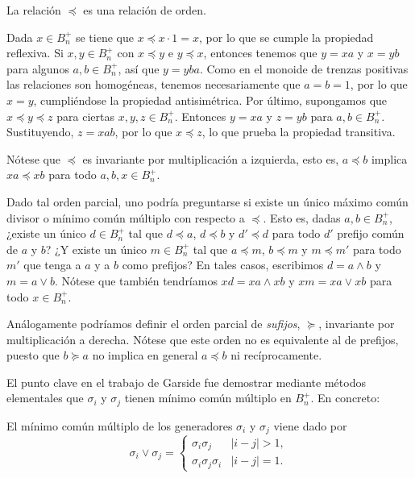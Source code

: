 \documentclass[TFG.tex]{subfiles}
\begin{document}
\begin{lemma}
La relación $\preccurlyeq$ es una relación de orden.
\end{lemma}
\begin{dem}
Dada $x\in B_n^+$ se tiene que $x\preccurlyeq x\cdot 1=x$, por lo que se cumple la propiedad reflexiva. Si $x,y\in B_n^+$ con $x \preccurlyeq y $ e $y \preccurlyeq x$, entonces tenemos que $y=xa$ y $x=yb$ para algunos $a,b\in B_n^+$, así que $y=yba$. Como en el monoide de trenzas positivas las relaciones son homogéneas, tenemos necesariamente que $a=b=1$, por lo que $x=y$, cumpliéndose la propiedad antisimétrica. Por último, supongamos que $x\preccurlyeq y\preccurlyeq z$ para ciertas $x,y,z\in B_n^+$. Entonces $y=xa$ y $z=yb$ para $a,b\in B_n^+$. Sustituyendo, $z=xab$, por lo que $x\preccurlyeq z$, lo que prueba la propiedad transitiva. \QED
\end{dem}
Nótese que $\preccurlyeq$ es invariante por multiplicación a izquierda, esto es, $a\preccurlyeq b$ implica $xa\preccurlyeq xb$ para todo $a,b,x\in B_n^+$. %

Dado tal orden parcial, uno podría preguntarse si existe un único máximo común divisor o mínimo común múltiplo con respecto a $\preccurlyeq$. Esto es, dadas $a,b\in B_n^+$, ¿existe un único $d\in B_n^+$ tal que $d\preccurlyeq a$, $d\preccurlyeq b$ y $d'\preccurlyeq d$ para todo $d'$ prefijo común de $a$ y $b$? ¿Y existe un único $m\in B_n^+$ tal que $a\preccurlyeq m$, $b\preccurlyeq m$ y $m\preccurlyeq m'$ para todo $m'$ que tenga a $a$ y a $b$ como prefijos? En tales casos, escribimos $d=a\land b$ y $m=a\lor b$. Nótese que también tendríamos $xd=xa\land xb$ y $xm=xa\lor xb$ para todo $x\in B_n^+$.

\begin{nota}
Análogamente podríamos definir el orden parcial de \emph{sufijos}, $\succcurlyeq$, invariante por multiplicación a derecha. Nótese que este orden no es equivalente al de prefijos, puesto que $b\succcurlyeq a$ no implica en general $a\preccurlyeq b$ ni recíprocamente. 
\end{nota}

El punto clave en el trabajo de Garside fue demostrar mediante métodos elementales que $\sigma_i$ y $\sigma_j$ tienen mínimo común múltiplo en $B_n^+$. En concreto:
\begin{prop} 
El mínimo común múltiplo de los generadores $\sigma_i$ y $\sigma_j$ viene dado por
$$\sigma_i\lor\sigma_j=\begin{cases}
\sigma_i\sigma_j & |i-j|>1,\\
\sigma_i\sigma_j\sigma_i & |i-j|=1.
\end{cases}$$
\end{prop}
\end{document}
